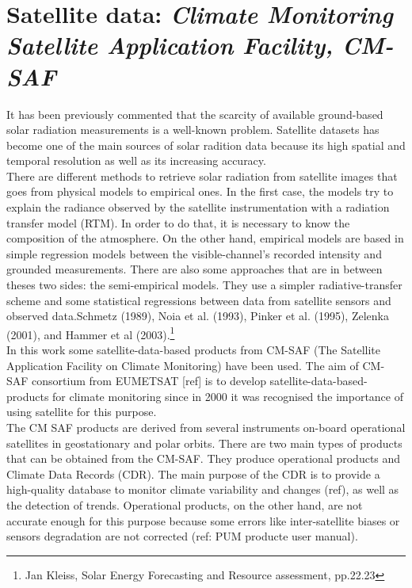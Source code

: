 \section{Satellite data: \textit{Climate Monitoring Satellite Application Facility, CM-SAF}}

It has been previously commented that the scarcity of available ground-based solar radiation measurements is a well-known problem. Satellite datasets has become one of the main sources of solar radition data because its high spatial and temporal resolution as well as its increasing accuracy.\\

There are different methods to retrieve solar radiation from satellite images that goes from physical models to empirical ones. In the first case, the models try to explain the radiance observed by the satellite instrumentation with a radiation transfer model (RTM). In order to do that, it is necessary to know the composition of the atmosphere. On the other hand, empirical models are based in simple regression models between the visible-channel's recorded intensity and grounded measurements. There are also some approaches that are in between theses two sides: the semi-empirical models. They use a simpler radiative-transfer scheme and some statistical regressions between data from satellite sensors and observed data.Schmetz (1989), Noia et al. (1993), Pinker et al. (1995), Zelenka (2001), and Hammer et al (2003).\footnote{Jan Kleiss, Solar Energy Forecasting and Resource assessment, pp.22.23}\\

In this work some satellite-data-based products from CM-SAF (The Satellite Application Facility on Climate Monitoring) have been used. The aim of CM-SAF consortium from EUMETSAT [ref] is to develop satellite-data-based-products for climate monitoring since in 2000 it was recognised the importance of using satellite for this purpose.\\

The CM SAF products are derived from several instruments on-board operational satellites in geostationary and polar orbits. There are two main types of products that can be obtained from the CM-SAF. They produce operational products and Climate Data Records (CDR). The main purpose of the CDR is to provide a high-quality database to monitor climate variability and changes (ref), as well as the detection of trends. Operational products, on the other hand, are not accurate enough for this purpose because some errors like inter-satellite biases or sensors degradation are not corrected (ref: PUM producte user manual).\\


